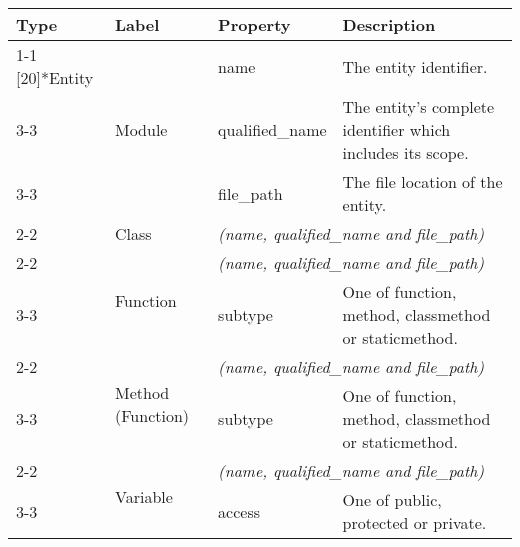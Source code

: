 \begin{tabularx}{\textwidth}{p{1.8cm}llX}
\toprule
\textbf{Type} & \textbf{Label} & \textbf{Property} & \textbf{Description} \\
\cmidrule{1-1}\cmidrule{2-2}\cmidrule{3-3}\cmidrule{4-4}
\multirow{10}[20]{*}{Entity} & \multirow{3}[6]{*}{\textsf{Module}} & \textsf{name} & The entity identifier. \\
\cmidrule{3-3}\cmidrule{4-4}
 &  & \textsf{qualified\_\textsf{name}} & The entity's complete identifier which includes its scope. \\
\cmidrule{3-3}\cmidrule{4-4}
 &  & \textsf{file\_path} & The file location of the entity. \\
\cmidrule{2-2}\cmidrule{3-3}\cmidrule{4-4}
 & \textsf{Class} & \multicolumn{2}{l}{\textit{(\textsf{name}, \textsf{qualified\_\textsf{name}} and \textsf{file\_path})}} \\
\cmidrule{2-2}\cmidrule{3-3}\cmidrule{4-4}
 & \multirow{2}[4]{*}{\textsf{Function}} & \multicolumn{2}{l}{\textit{(\textsf{name}, \textsf{qualified\_\textsf{name}} and \textsf{file\_path})}} \\
\cmidrule{3-3}\cmidrule{4-4}
 &  & \textsf{subtype} & One of \textsf{function}, \textsf{method}, \textsf{class\textsf{method}} or \textsf{static\textsf{method}}. \\
\cmidrule{2-2}\cmidrule{3-3}\cmidrule{4-4}
 & \multirow{2}[4]{*}{\textsf{Method} (\textsf{Function})} & \multicolumn{2}{l}{\textit{(\textsf{name}, \textsf{qualified\_\textsf{name}} and \textsf{file\_path})}} \\
\cmidrule{3-3}\cmidrule{4-4}
 &  & \textsf{subtype} & One of \textsf{function}, \textsf{method}, \textsf{class\textsf{method}} or \textsf{static\textsf{method}}. \\
\cmidrule{2-2}\cmidrule{3-3}\cmidrule{4-4}
 & \multirow{2}[4]{*}{\textsf{Variable}} & \multicolumn{2}{l}{\textit{(\textsf{name}, \textsf{qualified\_\textsf{name}} and \textsf{file\_path})}} \\
\cmidrule{3-3}\cmidrule{4-4}
 &  & \textsf{access} & One of \textsf{public}, \textsf{protected} or \textsf{private}. \\
\bottomrule
\end{tabularx}


